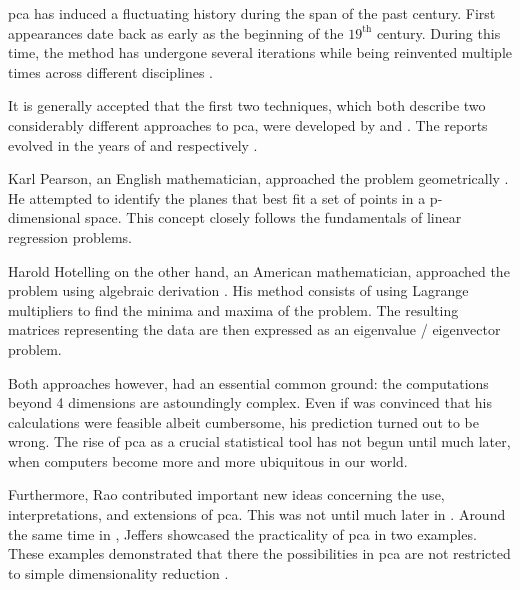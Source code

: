 \Gls{pca} has induced a fluctuating history during the span of the past century.
First appearances date back as early as the beginning of the $19^{\text{th}}$ century. 
During this time, the method has undergone several iterations while being reinvented multiple times across different disciplines \cite{jolliffe2016principal}.\bigskip


It is generally accepted that the first two techniques, which both describe two considerably different approaches to \gls{pca}, were developed by \citeauthor{pearson1901liii} and \citeauthor{hotelling1933analysis}. 
The reports evolved in the years of \citeyear{pearson1901liii} and \citeyear{hotelling1933analysis} respectively \cite{Jolliffe2002book}.

Karl Pearson, an English mathematician, approached the problem geometrically \cite{pearson1901liii}.
He attempted to identify the planes that best fit a set of points in a p-dimensional space.
This concept closely follows the fundamentals of linear regression problems.

Harold Hotelling on the other hand, an American mathematician, approached the problem using algebraic derivation \cite{hotelling1933analysis}.
His method consists of using Lagrange multipliers to find the minima and maxima of the problem.
The resulting matrices representing the data are then expressed as an eigenvalue / eigenvector problem.\medskip


Both approaches however, had an essential common ground: the computations beyond 4 dimensions are astoundingly complex.
Even if \citeauthor{pearson1901liii} was convinced that his calculations were feasible albeit cumbersome, his prediction turned out to be wrong.
The rise of \gls{pca} as a crucial statistical tool has not begun until much later, when computers become more and more ubiquitous in our world.\bigskip


Furthermore, Rao \cite{rao1964use} contributed important new ideas concerning the use, interpretations, and extensions of \gls{pca}.
This was not until much later in \citeyear{rao1964use}.
Around the same time in \citeyear{jeffers1967two}, Jeffers \cite{jeffers1967two} showcased the practicality of \gls{pca} in two examples. 
These examples demonstrated that there the possibilities in \gls{pca} are not restricted to simple dimensionality reduction \cite{Jolliffe2002book}.



